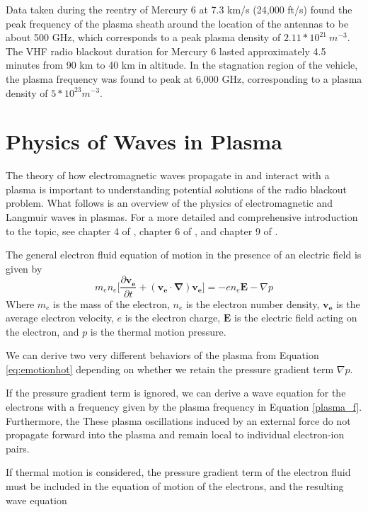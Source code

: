 \documentclass[twocolumn]{article}
\begin{document}
Data taken during the reentry of Mercury 6 at 7.3 km/s (24,000 ft/s) found the peak frequency of the plasma sheath around the location of the antennas to be about 500 GHz, which corresponds to a peak plasma density of $2.11*10^{21} \  m^{-3}$.
The VHF radio blackout duration for Mercury 6 lasted approximately 4.5 minutes from 90 km to 40 km in altitude.
In the stagnation region of the vehicle, the plasma frequency was found to peak at 6,000 GHz, corresponding to a plasma density of $5*10^{23} m^{-3}$. \cite{lehnert_plasma_1964}


\section{Physics of Waves in Plasma} \label{sec:Waves}
The theory of how electromagnetic waves propagate in and interact with a plasma is important to understanding potential solutions of the radio blackout problem.
What follows is an overview of the physics of electromagnetic and Langmuir waves in plasmas.
For a more detailed and comprehensive introduction to the topic, see chapter 4 of \cite{chen_introduction_1984}, chapter 6 of \cite{papas_theory_1965}, and chapter 9 of \cite{fitzpatrick_maxwells_2008}.

The general electron fluid equation of motion in the presence of an electric field is given by
\begin{equation} \label{eq:emotionhot}
m_en_e \lbrack \frac{\partial \mathbf{v_e}}{\partial t} + \left( \mathbf{v_e} \cdot \mathbf{\nabla} \right) \mathbf{v_e} \rbrack = -en_e\mathbf{E} - \nabla p
\end{equation}
Where $m_e$ is the mass of the electron, $n_e$ is the electron number density, $\mathbf{v_e}$ is the average electron velocity, $e$ is the electron charge, $\mathbf{E}$ is the electric field acting on the electron, and $p$ is the thermal motion pressure.

We can derive two very different behaviors of the plasma from Equation \ref{eq:emotionhot} depending on whether we retain the pressure gradient term $\nabla p$.

If the pressure gradient term is ignored, we can derive a wave equation for the electrons with a frequency given by the plasma frequency in Equation \ref{plasma_f}.
Furthermore, the 
These plasma oscillations induced by an external force do not propagate forward into the plasma and remain local to individual electron-ion pairs.

If thermal motion is considered, the pressure gradient term of the electron fluid must be included in the equation of motion of the electrons, and the resulting wave equation 
\end{document}
